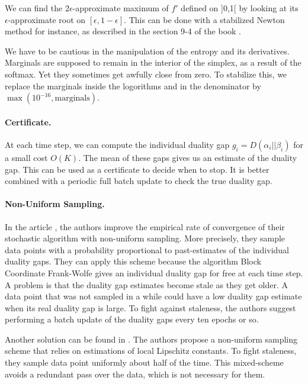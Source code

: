 \documentclass{article}
\DeclareMathOperator{\1}{\mathbb{1}}
\begin{document}
We can find the $2\epsilon$-approximate maximum of $f'$ defined on ]0,1[ by looking at its $\epsilon$-approximate root on $[\epsilon,1-\epsilon]$.
This can be done with a stabilized Newton method for instance, as described in the section 9-4 of the book \cite{press_numerical_1992}.

We have to be cautious in the manipulation of the entropy and its derivatives.
Marginals are supposed to remain in the interior of the simplex, as a result of the softmax.
Yet they sometimes get awfully close from zero.
To stabilize this, we replace the marginals inside the logorithms and in the denominator by $\max(10^{-16}, \textrm{marginals})$.


\paragraph{Certificate.}
At each time step, we can compute the individual duality gap $g_i = D(\alpha_i || \beta_i)$ for a small cost $O(K)$.
The mean of these gaps gives us an estimate of the duality gap.
This can be used as a certificate to decide when to stop.
It is better combined with a periodic full batch update to check the true duality gap.

\paragraph{Non-Uniform Sampling.} 
In the article \cite{osokin_minding_2016}, the authors improve the empirical rate of convergence of their stochastic algorithm with non-uniform sampling.
More precisely, they sample data points with a probability proportional to past-estimates of the individual duality gaps.
They can apply this scheme because the algorithm Block Coordinate Frank-Wolfe \cite{lacoste-julien_block-coordinate_2012} gives an individual duality gap for free at each time step.
A problem is that the duality gap estimates become stale as they get older.
A data point that was not sampled in a while could have a low duality gap estimate when its real duality gap is large.
To fight against staleness, the authors suggest performing a batch update of the duality gaps every ten epochs or so.

Another solution can be found in \cite{schmidt_non-uniform_2015}.
The authors propose a non-uniform sampling scheme that relies on estimations of local Lipschitz constants.
To fight staleness, they sample data point uniformly about half of the time.
This mixed-scheme avoids a redundant pass over the data, which is not necessary for them.
\end{document}
